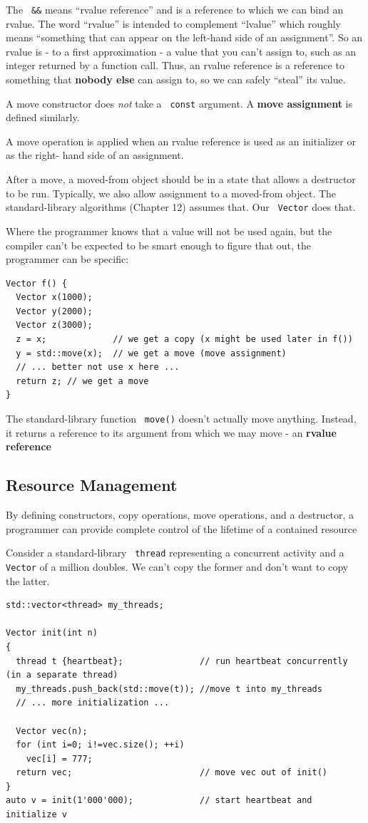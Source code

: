 \documentclass[11pt]{article}
\let\OldTexttt\texttt
\renewcommand{\texttt}[1]{\OldTexttt{\color{MidnightBlue} #1}}
\begin{document}
The \texttt{\&\&} means ``rvalue reference'' and is a reference to which we can bind an rvalue. The word
``rvalue'' is intended to complement ``lvalue'' which roughly means ``something that can appear on
the left-hand side of an assignment''. So an rvalue is - to a first approximation - a value that
you can't assign to, such as an integer returned by a function call. Thus, an rvalue reference
is a reference to something that \textbf{nobody else} can assign to, so we can safely ``steal'' its value.

A move constructor does \emph{not} take a \texttt{const} argument. A \textbf{move assignment} is defined similarly.

A move operation is applied when an rvalue reference is used as an initializer or as the right-
hand side of an assignment.

After a move, a moved-from object should be in a state that allows a destructor to be run.
Typically, we also allow assignment to a moved-from object. The standard-library algorithms
(Chapter 12) assumes that. Our \texttt{Vector} does that.

Where the programmer knows that a value will not be used again, but the compiler can’t be
expected to be smart enough to figure that out, the programmer can be specific:
\begin{verbatim}
Vector f() {
  Vector x(1000);
  Vector y(2000);
  Vector z(3000);
  z = x;             // we get a copy (x might be used later in f())
  y = std::move(x);  // we get a move (move assignment)
  // ... better not use x here ...
  return z; // we get a move
}
\end{verbatim}

The standard-library function \texttt{move()} doesn't actually move anything. Instead, it returns a
reference to its argument from which we may move - an \textbf{rvalue reference}
\subsection{Resource Management}
\label{sec:org97c4ff0}

By defining constructors, copy operations, move operations, and a destructor, a programmer can
provide complete control of the lifetime of a contained resource

Consider a standard-library \texttt{thread} representing a concurrent activity and a \texttt{Vector} of
a million doubles. We can't copy the former and don't want to copy the latter.
\begin{verbatim}
std::vector<thread> my_threads;

Vector init(int n)
{
  thread t {heartbeat};               // run heartbeat concurrently (in a separate thread)
  my_threads.push_back(std::move(t)); //move t into my_threads
  // ... more initialization ...
  
  Vector vec(n);
  for (int i=0; i!=vec.size(); ++i)
    vec[i] = 777;
  return vec;                         // move vec out of init()
}
auto v = init(1'000'000);             // start heartbeat and initialize v
\end{verbatim}
\end{document}

